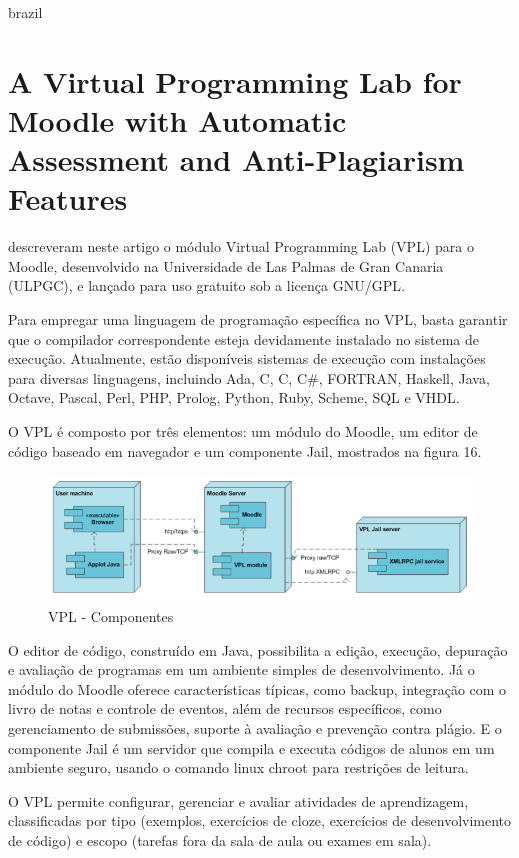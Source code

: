 \begin{otherlanguage*}{brazil}
\section{A Virtual Programming Lab for Moodle with Automatic Assessment and Anti-Plagiarism Features}

\textcite{rodriguezdelpinoandroyo} descreveram neste artigo o módulo Virtual Programming Lab (VPL) para o Moodle, desenvolvido na Universidade de Las Palmas de Gran Canaria (ULPGC), e lançado para uso gratuito sob a licença GNU/GPL.

Para empregar uma linguagem de programação específica no VPL, basta garantir que o compilador correspondente esteja devidamente instalado no sistema de execução. Atualmente, estão disponíveis sistemas de execução com instalações para diversas linguagens, incluindo Ada, C, C\+\+, C\#, FORTRAN, Haskell, Java, Octave, Pascal, Perl, PHP, Prolog, Python, Ruby, Scheme, SQL e VHDL.
 
O VPL é composto por três elementos: um módulo do Moodle, um editor de código baseado em navegador e um componente Jail, mostrados na figura 16.

\begin{figure}[h!]
	   \centering
            \caption{VPL - Componentes}
            \label{fig:ModeloConceitual}
	   	\includegraphics[scale=0.5]{pictures/VPL_componentes.png}
\end{figure}

O editor de código, construído em Java, possibilita a edição, execução, depuração e avaliação de programas em um ambiente simples de desenvolvimento. Já o módulo do Moodle oferece características típicas, como backup, integração com o livro de notas e controle de eventos, além de recursos específicos, como gerenciamento de submissões, suporte à avaliação e prevenção contra plágio. E o componente Jail é um servidor que compila e executa códigos de alunos em um ambiente seguro, usando o comando linux chroot para restrições de leitura. 

O VPL permite configurar, gerenciar e avaliar atividades de aprendizagem, classificadas por tipo (exemplos, exercícios de cloze, exercícios de desenvolvimento de código) e escopo (tarefas fora da sala de aula ou exames em sala).


\end{otherlanguage*}
